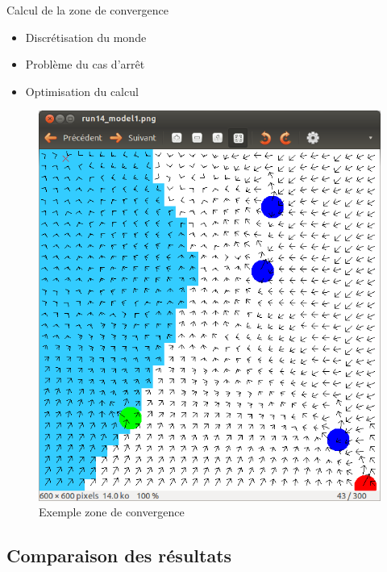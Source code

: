 \documentclass{beamer}
\begin{document}
\begin{frame}
  \begin{block}{Calcul de la zone de convergence}
    \begin{itemize}
      \item Discrétisation du monde
      \item Problème du cas d'arrêt
      \item Optimisation du calcul
    \end{itemize}
  \end{block}
  \begin{figure}
    \centering
    \includegraphics[scale=0.2]{exp.png}
    \caption{Exemple zone de convergence}
  \end{figure}
\end{frame}

\subsection{Comparaison des résultats}
\end{document}
